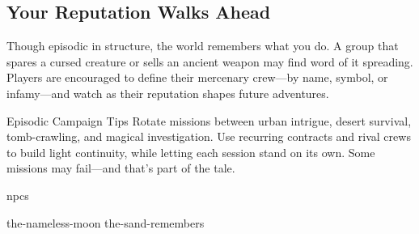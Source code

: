 \subsection*{Your Reputation Walks Ahead}

Though episodic in structure, the world remembers what you do. A group that spares a cursed creature or sells an ancient weapon may find word of it spreading. Players are encouraged to define their mercenary crew—by name, symbol, or infamy—and watch as their reputation shapes future adventures.

\begin{CommentBox}{Episodic Campaign Tips}
    Rotate missions between urban intrigue, desert survival, tomb-crawling, and magical investigation. Use recurring contracts and rival crews to build light continuity, while letting each session stand on its own. Some missions may fail—and that’s part of the tale.
\end{CommentBox}


{npcs}


{the-nameless-moon}
{the-sand-remembers}

